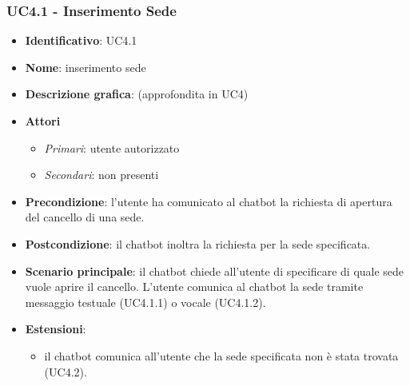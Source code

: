 \subsubsection{UC4.1 - Inserimento Sede}
\begin{itemize}
    \item \textbf{Identificativo}: UC4.1
    \item \textbf{Nome}: inserimento sede
    \item \textbf{Descrizione grafica}: (approfondita in UC4)
    \item \textbf{Attori}
 \begin{itemize} 
    \item \textit{Primari}: utente autorizzato 
    \item \textit{Secondari}: non presenti
 \end{itemize}
 \item \textbf{Precondizione}: l'utente ha comunicato al chatbot la richiesta di apertura del cancello di una sede.
 \item \textbf{Postcondizione}: il chatbot inoltra la richiesta per la sede specificata.
 \item \textbf{Scenario principale}: il chatbot chiede all'utente di specificare di quale sede vuole aprire il cancello. L'utente comunica al chatbot la sede tramite messaggio testuale (UC4.1.1) o vocale (UC4.1.2).
\item \textbf{Estensioni}: 
 \begin{itemize} 
    \item il chatbot comunica all'utente che la sede specificata non è stata trovata (UC4.2).
 \end{itemize}
\end{itemize}

